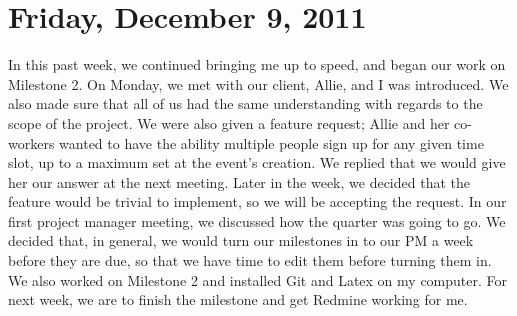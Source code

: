 \documentclass{article}
\begin{document}
\section{Friday, December 9, 2011}
In this past week, we continued bringing me up to speed, and began our work on
Milestone 2. On Monday, we met with our client, Allie, and I was introduced. We also
made sure that all of us had the same understanding with regards to the scope of the
project. We were also given a feature request; Allie and her co-workers wanted to have
the ability multiple people sign up for any given time slot, up to a maximum set at
the event's creation. We replied that we would give her our answer at the next
meeting. Later in the week, we decided that the feature would be trivial to implement,
so we will be accepting the request. In our first project manager meeting, we discussed
how the quarter was going to go. We decided that, in general, we would turn our
milestones in to our PM a week before they are due, so that we have time to edit them
before turning them in. We also worked on Milestone 2 and installed Git and Latex on
my computer. For next week, we are to finish the milestone and get Redmine working for
me.
\end{document}

